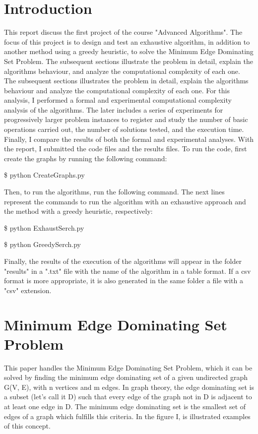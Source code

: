\documentclass[...]{revdetua}
\begin{document}
\section{Introduction}
This report discuss the first project of the course "Advanced Algorithms". The focus of this project is to design and test an exhaustive algorithm, in addition to another method using a greedy heuristic, to solve the Minimum Edge Dominating Set Problem.
The subsequent sections illustrate the problem in detail, explain the algorithms behaviour, and analyze the computational complexity of each one.
The subsequent sections illustrates the problem in detail, explain the algorithms behaviour and analyze the computational complexity of 
each one. For this analysis, I performed a formal and experimental computational complexity analysis of the algorithms. The later includes a series of experiments for progressively larger problem instances to register and study the number of basic operations carried out, the number of solutions tested, and the execution time. Finally, I compare the results of both the formal and experimental analyses.
With the report, I submitted the code files and the results files. To run the code, first create the graphs by running the following command:\linebreak

\$ python CreateGraphs.py 

Then, to run the algorithms, run the following command. The next lines represent the commands to run the algorithm with an exhaustive approach and the method with a greedy heuristic, respectively:\linebreak

\$ python ExhaustSerch.py

\$ python GreedySerch.py

Finally, the results of the execution of the algorithms will appear in the folder "results" in a ".txt" file with the name of the algorithm in a table format. If a csv format is more appropriate, it is also generated in the same folder a file with a "csv" extension.

\section{Minimum Edge Dominating Set Problem}
This paper handles the Minimum Edge Dominating Set Problem, which it can be solved by finding the minimum edge dominating set of a given undirected graph G(V, E), with n vertices and m edges. In graph theory, the edge dominating set is a subset (let's call it D) such that every edge of the graph not in D is adjacent to at least one edge in D. The minimum edge dominating set is the smallest set of edges of a graph which fulfills this criteria. In the figure I, is illustrated examples of this concept.
\end{document}
